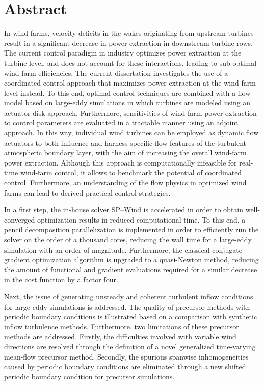 \chapter{Abstract}                                 \label{ch:abstract}

In wind farms, velocity deficits in the wakes originating from upstream turbines result in a significant decrease in power extraction in downstream turbine rows. The current control paradigm in industry optimizes power extraction at the turbine level, and does not account for these interactions, leading to sub-optimal wind-farm efficiencies. The current dissertation investigates the use of a coordinated control approach that maximizes power extraction at the wind-farm level instead. To this end, optimal control techniques are combined with a flow model based on large-eddy simulations in which turbines are modeled using an actuator disk approach. Furthermore, sensitivities of wind-farm power extraction to control parameters are evaluated in a tractable manner using an adjoint approach. In this way, individual wind turbines can be employed as dynamic flow actuators to both influence and harness specific flow features of the turbulent atmospheric boundary layer, with the aim of increasing the overall wind-farm power extraction. Although this approach is computationally infeasible for real-time wind-farm control, it allows to benchmark the potential of coordinated control. Furthermore, an understanding of the flow physics in optimized wind farms can lead to derived practical control strategies.

In a first step, the in-house solver SP--Wind is accelerated in order to obtain well-converged optimization results in reduced computational time. To this end, a pencil decomposition parallelization is implemented in order to efficiently run the solver on the order of a thousand cores, reducing the wall time for a large-eddy simulation with an order of magnitude. Furthermore, the classical conjugate-gradient optimization algorithm is upgraded to a quasi-Newton method, reducing the amount of functional and gradient evaluations required for a similar decrease in the cost function by a factor four. 

Next, the issue of generating unsteady and coherent turbulent inflow conditions for large-eddy simulations is addressed. The quality of precursor methods with periodic boundary conditions is illustrated based on a comparison with synthetic inflow turbulence methods. Furthermore, two limitations of these precursor methods are addressed. Firstly, the difficulties involved with variable wind directions are resolved through the definition of a novel generalized time-varying mean-flow precursor method. Secondly, the spurious spanwise inhomogeneities caused by periodic boundary conditions are eliminated through a new shifted periodic boundary condition for precursor simulations. 

